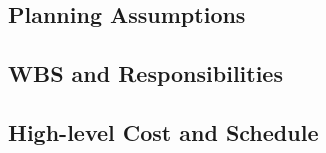 \subsection{Planning Assumptions}
\label{sec:fddp-slow-cryo-org-assmp}


\subsection{WBS and Responsibilities}
\label{sec:fddp-slow-cryo-org-wbs}

\subsection{High-level Cost and Schedule}
\label{sec:fddp-slow-cryo-org-cs}


